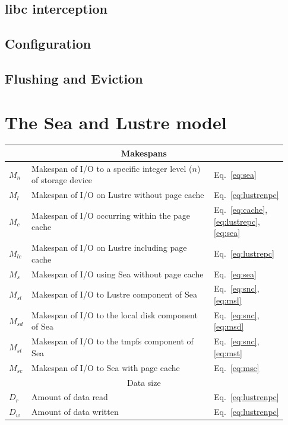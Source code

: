 \documentclass{report}
\begin{document}
    \subsection{libc interception}
    \subsection{Configuration}
    \subsection{Flushing and Eviction}
    \section{The Sea and Lustre model}\label{model}

    \begin{table}[h!]
    \centering
    \begin{tabular}{|p{0.03\linewidth}|p{0.7\linewidth}|p{0.2\linewidth}|} 
     \hline
     \multicolumn{3}{|c|}{Makespans} \\
     \hline
     $M_{n}$ & Makespan of I/O to a specific integer level ($n$) of storage device & Eq.~\ref{eq:sea}\\
     $M_{l}$ & Makespan of I/O on Lustre without page cache & Eq.~\ref{eq:lustrenpc}\\
     $M_{c}$ & Makespan of I/O occurring within the page cache & Eq.~\ref{eq:cache}, \ref{eq:lustrepc}, \ref{eq:sea}\\
     $M_{lc}$ & Makespan of I/O on Lustre including page cache & Eq.~\ref{eq:lustrepc}\\
     $M_{s}$ & Makespan of I/O using Sea without page cache  & Eq.~\ref{eq:sea}\\ 
     $M_{sl}$ & Makespan of I/O to Lustre component of Sea & Eq.~\ref{eq:snc}, \ref{eq:msl} \\
     $M_{sd}$ & Makespan of I/O to the local disk component of Sea & Eq.~\ref{eq:snc}, \ref{eq:msd} \\
     $M_{st}$ & Makespan of I/O to the tmpfs component of Sea & Eq.~\ref{eq:snc}, \ref{eq:mst} \\
     $M_{sc}$ & Makespan of I/O to Sea with page cache & Eq.~\ref{eq:msc} \\ 
     \hline
     \multicolumn{3}{|c|}{Data size} \\
     \hline
     $D_{r}$ & Amount of data read & Eq.~\ref{eq:lustrenpc}\\
     $D_{w}$ & Amount of data written & Eq.~\ref{eq:lustrenpc}\\

\end{tabular}
\end{table}
\end{document}
